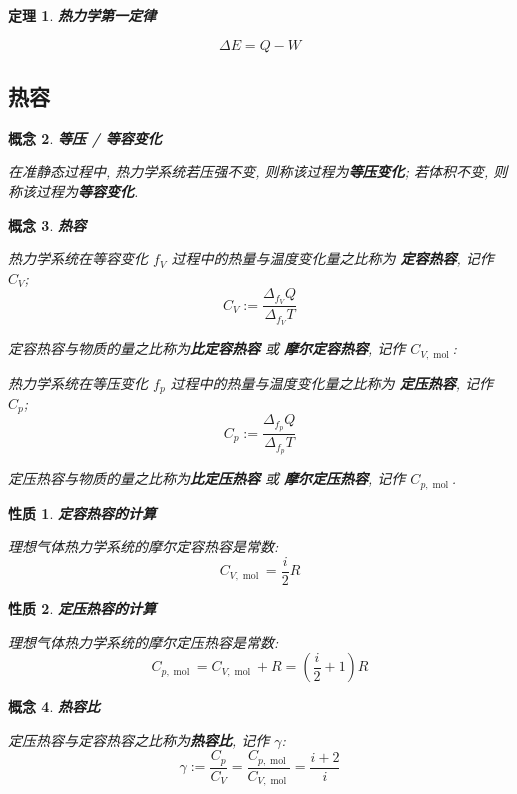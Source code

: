 \documentclass[UTF8]{ctexart}
\newcommand{\<}{\langle}
\renewcommand{\>}{\rangle}                              %
\newenvironment{dfn_box}{
    \begin{tcolorbox}[enhanced, colback=dfn_green2, boxrule=0pt, frame hidden,
        borderline west={0.7mm}{0.1mm}{dfn_green1},breakable]
    }
    {\end{tcolorbox}}
\newenvironment{thm_box}{
    \begin{tcolorbox}[enhanced, colback=thm_blue2, boxrule=0pt, frame hidden,
        borderline west={0.7mm}{0.1mm}{thm_blue1},breakable]
    }
    {\end{tcolorbox}}
\newenvironment{ppt_box}{
    \begin{tcolorbox}[enhanced, colback=ppt_pink2, boxrule=0pt, frame hidden,
        borderline west={0.7mm}{0.1mm}{ppt_pink1},breakable]
    }
    {\end{tcolorbox}}
\theoremstyle{MyStyle} %
\newtheorem{definition}{概念}[subsection]
\newenvironment{cpt}{\begin{dfn_box}\begin{definition}}{\end{definition}\end{dfn_box}}
\newtheorem{theorem}[definition]{定理}
\newenvironment{thm}{\begin{thm_box}\begin{theorem}}{\end{theorem}\end{thm_box}}
\newtheorem{property}{性质}[definition]
\newenvironment{ppt}{\begin{ppt_box}\begin{property}}{\end{property}\end{ppt_box}}
\DeclareMathOperator{\mol}{\mathrm{mol}}
\begin{document}
        \begin{thm}
            \textbf{热力学第一定律}

            \[\Delta E=Q-W\]
        \end{thm}

    \subsection{热容}
        
        \begin{cpt}
            \textbf{等压 / 等容变化}

            在准静态过程中, 热力学系统若压强不变, 则称该过程为\textbf{等压变化}; 若体积不变, 则称该过程为\textbf{等容变化}. 
        \end{cpt}
        
        \begin{cpt}
            \textbf{热容}

            热力学系统在等容变化 \(f_V\) 过程中的热量与温度变化量之比称为 \textbf{定容热容}, 记作 \(C_V\); 
            \[C_V:=\frac{\Delta_{f_V} Q}{\Delta_{f_V} T}\]

            定容热容与物质的量之比称为\textbf{比定容热容} 或 \textbf{摩尔定容热容}, 记作 \(C_{V,\mol}\): 

            热力学系统在等压变化 \(f_p\) 过程中的热量与温度变化量之比称为 \textbf{定压热容}, 记作 \(C_p\);
            \[C_p:=\frac{\Delta_{f_p} Q}{\Delta_{f_p} T}\]

            定压热容与物质的量之比称为\textbf{比定压热容} 或 \textbf{摩尔定压热容}, 记作 \(C_{p,\mol}\).
        \end{cpt}
        
        \begin{ppt}
            \textbf{定容热容的计算}

            理想气体热力学系统的摩尔定容热容是常数: 
            \[C_{V,\mol}=\frac{i}{2}R\]
        \end{ppt}
        
        \begin{ppt}
            \textbf{定压热容的计算}

            理想气体热力学系统的摩尔定压热容是常数: 
            \[C_{p,\mol}=C_{V,\mol}+R=\left(\frac{i}{2}+1\right)R\]
        \end{ppt}
        
        \begin{cpt}
            \textbf{热容比}

            定压热容与定容热容之比称为\textbf{热容比}, 记作 \(\gamma\): 
            \[\gamma:=\frac{C_p}{C_V}=\frac{C_{p,\mol}}{C_{V,\mol}}=\frac{i+2}{i}\]
        \end{cpt}
        
\end{document}
